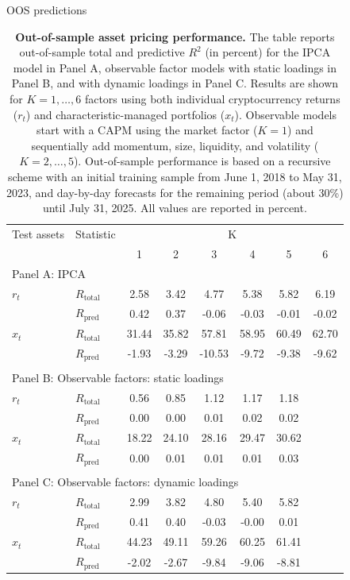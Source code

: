 \documentclass[
  12pt,
  a4paper,
  openany]{scrbook}
\begin{document}
OOS predictions

\begin{table}
\centering
\small
\caption[Out-of-sample asset pricing performance]%
{%
\textbf{Out-of-sample asset pricing performance.}
The table reports out-of-sample total and predictive $R^2$ (in percent) for the IPCA model in Panel A, observable factor models with static loadings in Panel B, and with dynamic loadings in Panel C. Results are shown for $K=1,\dots,6$ factors using both individual cryptocurrency returns ($r_t$) and characteristic-managed portfolios ($x_t$). Observable models start with a CAPM using the market factor ($K=1$) and sequentially add momentum, size, liquidity, and volatility ($K=2,\dots,5$). Out-of-sample performance is based on a recursive scheme with an initial training sample from June 1, 2018 to May 31, 2023, and day-by-day forecasts for the remaining period (about 30\%) until July 31, 2025. All values are reported in percent.
}
\label{tbl-model_comparison}
\vspace{5pt} %
\begin{tabular}{llcccccc}
\toprule
Test assets & Statistic & \multicolumn{6}{c}{K} \\
\cmidrule(lr){3-8}
 &  & 1 & 2 & 3 & 4 & 5 & 6 \\
\midrule
\multicolumn{8}{l}{Panel A: IPCA} \\
\midrule
$r_t$ & $R_{\text{total}}$ & 2.58 & 3.42 & 4.77 & 5.38 & 5.82 & 6.19 \\
      & $R_{\text{pred}}$  & 0.42 & 0.37 &-0.06 &-0.03 &-0.01 &-0.02 \\
$x_t$ & $R_{\text{total}}$ & 31.44 & 35.82 & 57.81 & 58.95 & 60.49 & 62.70 \\
      & $R_{\text{pred}}$  & -1.93 & -3.29 & -10.53 & -9.72 & -9.38 & -9.62 \\
\\[1pt]
\midrule
\multicolumn{8}{l}{Panel B: Observable factors: static loadings} \\
\midrule
$r_t$ & $R_{\text{total}}$ & 0.56 & 0.85 & 1.12 & 1.17 & 1.18 & \\
      & $R_{\text{pred}}$  & 0.00 & 0.00 & 0.01 & 0.02 & 0.02 & \\
$x_t$ & $R_{\text{total}}$ & 18.22 & 24.10 & 28.16 & 29.47 & 30.62 & \\
      & $R_{\text{pred}}$  & 0.00 & 0.01 & 0.01 & 0.01 & 0.03 & \\
\\[1pt]
\midrule
\multicolumn{8}{l}{Panel C: Observable factors: dynamic loadings} \\
\midrule
$r_t$ & $R_{\text{total}}$ & 2.99 & 3.82 & 4.80 & 5.40 & 5.82 & \\
      & $R_{\text{pred}}$  & 0.41 & 0.40 &-0.03 &-0.00 & 0.01 & \\
$x_t$ & $R_{\text{total}}$ & 44.23 & 49.11 & 59.26 & 60.25 & 61.41 & \\
      & $R_{\text{pred}}$  & -2.02 & -2.67 & -9.84 & -9.06 & -8.81 & \\
\bottomrule
\end{tabular}
\end{table}
\end{document}
